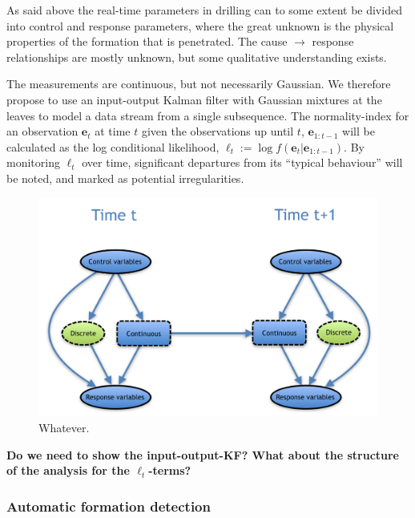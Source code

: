 As said above the real-time parameters in drilling can to some extent be divided into control and response parameters, where the great unknown is the physical properties of the formation that is penetrated.  The cause $\rightarrow$ response relationships are mostly unknown, but some qualitative understanding exists. 

The measurements are continuous, but not necessarily Gaussian. We therefore propose to use an input-output Kalman filter with Gaussian mixtures at the leaves to model a data stream from a single subsequence. The normality-index for an observation ${\bm e}_t$ at time $t$ given the observations up until $t$, ${\bm e}_{1:t-1}$ will be calculated as the log conditional likelihood,  $\ell_t := \log f\left({\bm e}_t|{\bm e}_{1:t-1}\right)$. By monitoring  $\ell_t$ over time, significant departures from its ``typical behaviour'' will be noted, and marked as potential irregularities.

\begin{figure}
\begin{center}
\includegraphics[scale=0.5]{./figures/VT_Scenario2} 
\caption{\label{Figure:VTEraticTorqueMarked}  Whatever.}
\end{center}
\end{figure}

{\bf Do we need to show the input-output-KF? What about the structure of the analysis for the $\ell_t$-terms?}


\subsubsection{Automatic formation detection}\label{SubSection:DetectionFormation}

